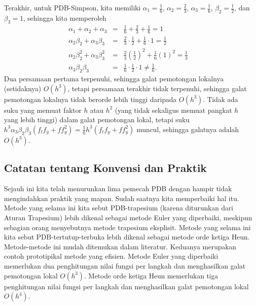 Terakhir, untuk PDB-Simpson, kita memiliki $\alpha_{1}=\frac{1}{6}$,
$\alpha_{2}=\frac{2}{3}$, $\alpha_{3}=\frac{1}{6}$, $\beta_{2}=\frac{1}{2}$,
dan $\beta_{3}=1$, sehingga kita memperoleh
\begin{eqnarray*}
\alpha_{1}+\alpha_{2}+\alpha_{3} & = & \frac{1}{6}+\frac{2}{3}+\frac{1}{6}=1\\
\alpha_{2}\beta_{2}+\alpha_{3}\beta_{3} & = & \frac{2}{3}\cdot\frac{1}{2}+\frac{1}{6}\cdot1=\frac{1}{2}\\
\alpha_{2}\beta_{2}^{2}+\alpha_{3}\beta_{3}^{2} & = & \frac{2}{3}\left(\frac{1}{2}\right)^{2}+\frac{1}{6}(1)^{2}=\frac{1}{3}\\
\alpha_{3}\beta_{2}\beta_{3} & = & \frac{1}{6}\cdot\frac{1}{2}\cdot1\neq\frac{1}{6}.
\end{eqnarray*}
Dua persamaan pertama terpenuhi, sehingga galat pemotongan lokalnya
(setidaknya) $O(h^{3})$, tetapi persamaan terakhir tidak terpenuhi,
sehingga galat pemotongan lokalnya tidak berorde lebih tinggi daripada
$O(h^{3})$. Tidak ada suku yang memuat faktor $h$ atau $h^{2}$
(yang tidak sekaligus memuat pangkat $h$ yang lebih tinggi) dalam
galat pemotongan lokal, tetapi suku $h^{3}\alpha_{3}\beta_{2}\beta_{3}(f_{t}f_{y}+ff_{y}^{2})=\frac{1}{6}h^{3}(f_{t}f_{y}+ff_{y}^{2})$
muncul, sehingga galatnya adalah $O(h^{3})$.

\subsection{Catatan tentang Konvensi dan Praktik}

Sejauh ini kita telah menurunkan lima pemecah PDB dengan hampir tidak
mengindahkan praktik yang mapan. Sudah saatnya kita memperbaiki hal
itu. Metode yang selama ini kita sebut PDB-trapesium (karena diturunkan
dari Aturan Trapesium) lebih dikenal sebagai metode Euler yang diperbaiki,
meskipun sebagian orang menyebutnya metode trapesium eksplisit.
Metode yang selama ini kita sebut PDB-tertutup-terbuka lebih dikenal
sebagai metode orde ketiga Heun.
Metode-metode ini mudah ditemukan dalam literatur. Keduanya merupakan
contoh prototipikal metode yang efisien. Metode Euler yang diperbaiki
memerlukan dua penghitungan nilai fungsi per langkah dan menghasilkan
galat pemotongan lokal $O(h^{3})$. Metode orde ketiga Heun memerlukan
tiga penghitungan nilai fungsi per langkah dan menghasilkan galat
pemotongan lokal $O(h^{4})$.

